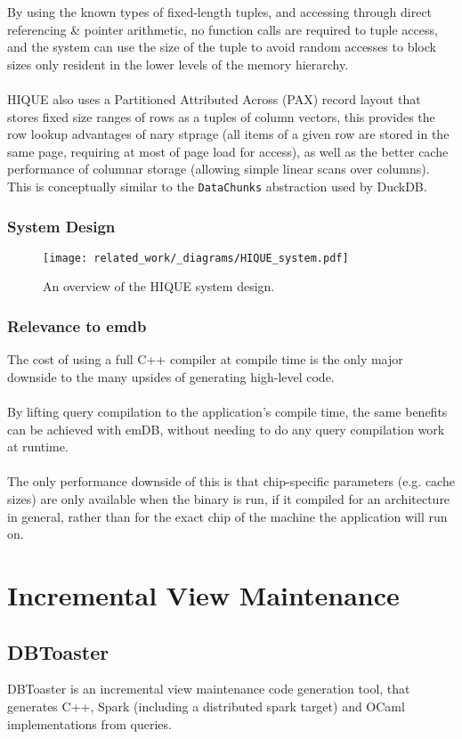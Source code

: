By using the known types of fixed-length tuples, and accessing through direct referencing \& pointer arithmetic, no function calls are required to tuple access, and the system can use the size of the tuple to avoid random accesses to block sizes only resident in the lower levels of the memory hierarchy.
\\
\\ HIQUE also uses a Partitioned Attributed Across (PAX) record layout\cite{PAXStorageModel} that stores fixed size ranges of rows as a tuples of column vectors, this provides the row lookup advantages of nary stprage (all items of a given row are stored in the same page, requiring at most of page load for access), as well as the better cache performance of columnar storage (allowing simple linear scans over columns). This is conceptually similar to the \texttt{DataChunks} abstraction used by DuckDB.
\subsubsection{System Design}
\begin{figure}[h!]
    \centering
    \texttt{[image: related\_work/\_diagrams/HIQUE\_system.pdf]}
    \caption{An overview of the HIQUE system design.}
\end{figure}
\subsubsection{Relevance to emdb}
The cost of using a full C++ compiler at compile time is the only major downside to the many upsides of generating high-level code.
\\
\\ By lifting query compilation to the application's compile time, the same benefits can be achieved with emDB, without needing to do any query compilation work at runtime.
\\
\\ The only performance downside of this is that chip-specific parameters (e.g. cache sizes) are only available when the binary is run, if it compiled for an architecture in general, rather than for the exact chip of the machine the application will run on.

\section{Incremental View Maintenance}
\subsection{DBToaster}
\label{sec:db_toaster}
DBToaster is an incremental view maintenance code generation tool, that generates C++, Spark (including a distributed spark target) and OCaml implementations from queries.
